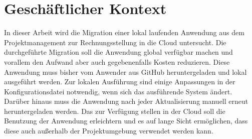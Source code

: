\section{Geschäftlicher Kontext}

In dieser Arbeit wird die Migration einer lokal laufenden Anwendung aus dem Projektmanagement zur Rechnungsstellung in die Cloud untersucht.
Die durchgeführte Migration soll die Anwendung global verfügbar machen und vorallem den Aufwand aber auch gegebenenfalls Kosten reduzieren.
Diese Anwendung muss bisher vom Anwender aus GitHub heruntergeladen und lokal ausgeführt werden.
Zur lokalen Ausführung sind einige Anpassungen in der Konfigurationsdatei notwendig, wenn sich das ausführende System ändert.
Darüber hinaus muss die Anwendung nach jeder Aktualisierung manuell erneut heruntergeladen werden.
Das zur Verfügung stellen in der Cloud soll die Benutzung der Anwendung erleichtern und es auf lange Sicht ermöglichen, dass diese auch außerhalb der Projektumgebung verwendet werden kann.
